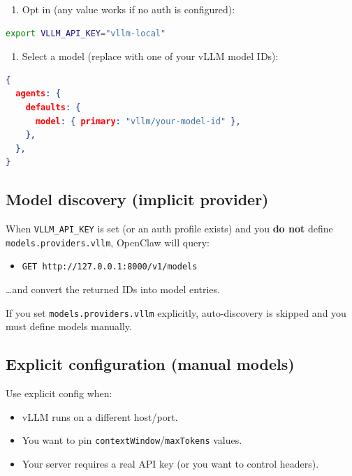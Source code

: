 \begin{enumerate}
  \item Opt in (any value works if no auth is configured):
\end{enumerate}


\begin{lstlisting}[language=bash]
export VLLM_API_KEY="vllm-local"
\end{lstlisting}


\begin{enumerate}
  \item Select a model (replace with one of your vLLM model IDs):
\end{enumerate}


\begin{lstlisting}[language=json]
{
  agents: {
    defaults: {
      model: { primary: "vllm/your-model-id" },
    },
  },
}
\end{lstlisting}


\subsection{Model discovery (implicit provider)}


When \texttt{VLLM\_API\_KEY} is set (or an auth profile exists) and you \textbf{do not} define \texttt{models.providers.vllm}, OpenClaw will query:

\begin{itemize}
  \item \texttt{GET http://127.0.0.1:8000/v1/models}
\end{itemize}


…and convert the returned IDs into model entries.

If you set \texttt{models.providers.vllm} explicitly, auto-discovery is skipped and you must define models manually.

\subsection{Explicit configuration (manual models)}


Use explicit config when:

\begin{itemize}
  \item vLLM runs on a different host/port.
  \item You want to pin \texttt{contextWindow}/\texttt{maxTokens} values.
  \item Your server requires a real API key (or you want to control headers).
\end{itemize}


